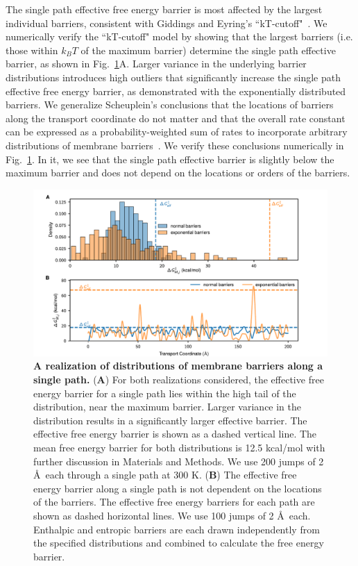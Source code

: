 \documentclass[12pt]{article}
\begin{document}
The single path effective free energy barrier is most affected by the largest individual barriers, consistent with Giddings and Eyring's ``kT-cutoff"~\cite{giddings_multi-barrier_1958}. We numerically verify the ``kT-cutoff" model by showing that the largest barriers (i.e. those within $k_B T$ of the maximum barrier) determine the single path effective barrier, as shown in Fig.~\ref{fig:effective_barriers}A. Larger variance in the underlying barrier distributions introduces high outliers that significantly increase the single path effective free energy barrier, as demonstrated with the exponentially distributed barriers. We generalize Scheuplein's conclusions that the locations of barriers along the transport coordinate do not matter and that the overall rate constant can be expressed as a probability-weighted sum of rates to incorporate arbitrary distributions of membrane barriers~\cite{scheuplein_application_1968}. We verify these conclusions numerically in Fig.~\ref{fig:effective_barriers}. In it, we see that the single path effective barrier is slightly below the maximum barrier and does not depend on the locations or orders of the barriers.

\begin{figure}[ht!]
    \centering
    \includegraphics[width=\textwidth]{figures/fig2.pdf}
    \caption{\textbf{A realization of distributions of membrane barriers along a single path.} (\textbf{A}) For both realizations considered, the effective free energy barrier for a single path lies within the high tail of the distribution, near the maximum barrier. Larger variance in the distribution results in a significantly larger effective barrier. The effective free energy barrier is shown as a dashed vertical line. The mean free energy barrier for both distributions is 12.5 kcal/mol with further discussion in Materials and Methods. We use 200 jumps of 2 \AA~each through a single path at 300 K. (\textbf{B}) The effective free energy barrier along a single path is not dependent on the locations of the barriers. The effective free energy barriers for each path are shown as dashed horizontal lines. We use 100 jumps of 2 \AA~each. Enthalpic and entropic barriers are each drawn independently from the specified distributions and combined to calculate the free energy barrier.}
    \label{fig:effective_barriers}
\end{figure}
\end{document}
